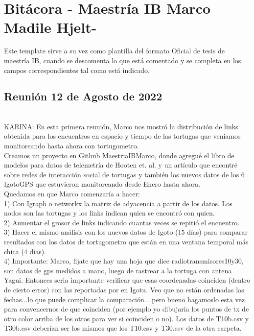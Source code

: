 \documentclass[12pt,screen,twoside,pagebackref]{ibtesis}
\begin{document}
\section*{Bitácora - Maestría IB Marco Madile Hjelt- }

Este template sirve a su vez como plantilla del formato Oficial de tesis de maestría IB, cuando se descomenta lo que está comentado y se completa en los campos correspondientes tal como está indicado.\\ 

\subsection{Reunión 12 de Agosto de 2022}\\

KARINA: En esta primera reunión, Marco nos mostró la distribución de links obtenida para los encuentros en espacio y tiempo de las tortugas que veniamos monitoreando hasta ahora con tortugometro.\\
Creamos un proyecto en Github MaestriaIBMarco, donde agregué el libro de modelos para datos de telemetría de Hooten et. al. y un artículo que encontré sobre redes de interacción social de tortugas y también los nuevos datos de los 6 IgotoGPS que estuvieron monitoreando desde Enero hasta ahora.\\
Quedamos en que Marco comenzaría a hacer:\\
1) Con Igraph o networkx la matriz de adyacencia a partir de los datos. Los nodos son las tortugas y los links indican quien se encontró con quien.\\ 
2) Aumentar el grosor de links indicando cuantas veces se repitió el encuentro.\\
3) Hacer el mismo análisis con los nuevos datos de Igoto (15 días) para comparar resultados con los datos de tortugometro que están en una ventana temporal más chica (4 días).\\
4) Importante: Marco, fijate que hay una hoja que dice radiotransmisores10y30, son datos de gps medidos a mano, luego de rastrear a la tortuga con antena Yagui. Entonces seria importante verificar que esas coordenadas coinciden (dentro de cierto error) con las reportadas por en Igotu. Veo que no están ordenadas las fechas...lo que puede complicar la comparación....pero bueno hagamoslo esta vez para convencernos de que coinciden (por ejemplo yo dibujaria los puntos de tx de otro color arriba de los otros para ver si coinciden o no). Los datos de T10b.csv y T30b.csv deberían ser los mismos que los T10.csv y T30.csv de la otra carpeta.\\ 
\end{document}
